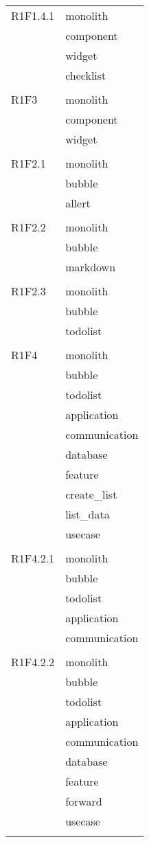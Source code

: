 \begin{center}
\begin{longtable}{|p{7cm}|p{7cm}|}
		R1F1.4.1 & monolith \\ & component \\ & widget \\ & checklist \\ & \\ \hline
		R1F3 & monolith \\ & component \\ & widget \\ & \\ \hline
		R1F2.1 & monolith \\ & bubble \\ & allert \\ & \\ \hline
		R1F2.2 & monolith \\ & bubble \\ & markdown \\ & \\ \hline
		R1F2.3 & monolith \\ & bubble \\ & todolist \\ & \\ \hline
		R1F4 & monolith \\ & bubble \\ & todolist \\ & application \\ & communication \\ & database \\ & feature \\ & create\_list \\ & list\_data \\ & usecase \\ & \\ \hline
		R1F4.2.1 & monolith \\ & bubble \\ & todolist \\ & application \\ & communication \\ & \\ \hline
		R1F4.2.2 & monolith \\ & bubble \\ & todolist \\ & application \\ & communication \\ & database \\ & feature \\ & forward \\ & usecase \\ & \\ \hline

\end{longtable}
\end{center}

